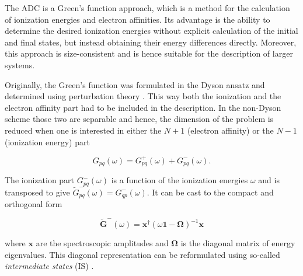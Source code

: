 The {ADC} is a Green's function approach, which is a method for the
calculation of ionization
energies and electron affinities.
Its advantage is the ability to determine the desired ionization energies
without explicit calculation of the initial and final states, but instead
obtaining their energy differences directly.
Moreover, this approach is size-consistent and is hence
suitable for the description of larger systems. \cite{Mertins96_1}

Originally, the Green's function was formulated in the Dyson ansatz and
determined using perturbation theory \cite{Schirmer82_1,Schirmer83}.
This way both the ionization and the
electron affinity part had to be included in the description. In the non-Dyson
scheme those two are separable and hence, the dimension of the problem is reduced
when one is interested in either the $N+1$ (electron affinity)
or the $N-1$ (ionization energy) part \cite{Schirmer98}

\begin{equation} \label{adc_ion_attach}
 G_{pq}(\omega) = G^+_{pq}(\omega) + G^-_{pq}(\omega) .
\end{equation}

The ionization part $ G^-_{pq}(\omega)$
is a function of the ionization energies
$\omega$ and is transposed to give
$\tilde{G}^-_{pq}(\omega) = G^-_{qp}(\omega)$.
It can be cast to the compact and orthogonal form

\begin{equation}\label{matrixspec}
\mathbf{\tilde{G}}^-(\omega) = \mathbf{x}^\dagger
                               (\omega\mathds{1}-\mathbf{\Omega})^{-1}\mathbf{x} 
\end{equation}

where $\mathbf{x}$ are the spectroscopic amplitudes and $\mathbf{\Omega}$ is
the diagonal matrix of energy eigenvalues.
This diagonal representation can be reformulated using so-called
\emph{intermediate states} (IS) \cite{Schirmer91}.

